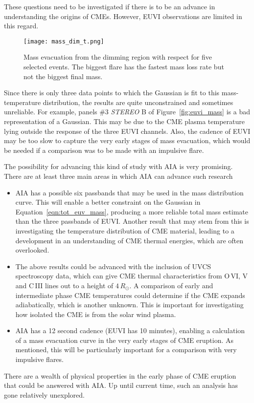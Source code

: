 These questions need to be investigated if there is to be an advance in understanding the origins of CMEs. However, EUVI observations are limited in this regard.
\begin{figure}[t!]
\begin{center}
\texttt{[image: mass\_dim\_t.png]}
\caption[Mass evacuation with time]{Mass evacuation from the dimming region with respect for five selected events. The biggest flare has the fastest mass loss rate but not the biggest final mass. \citep{aschw09}}
\label{fig:mass_dim_time}
\end{center}
\end{figure}
Since there is only three data points to which the Gaussian is fit to this mass-temperature distribution, the results are quite unconstrained and sometimes unreliable. For example, panels \#3 \emph{STEREO} B of Figure~\ref{fig:euvi_mass} is a bad representation of a Gaussian. This may be due to the CME plasma temperature lying outside the response of the three EUVI channels. Also, the cadence of EUVI may be too slow to capture the very early stages of mass evacuation, which would be needed if a comparison was to be made with an impulsive flare.

The possibility for advancing this kind of study with AIA is very promising. There are at least three main areas in which AIA can advance such research
\begin{itemize}
\item AIA has a possible six passbands that may be used in the mass distribution curve. This will enable a better constraint on the Gaussian in Equation~\ref{eqn:tot_euv_mass}, producing a more reliable total mass estimate than the three passbands of EUVI. Another result that may stem from this is investigating the temperature distribution of CME material, leading to a development in an understanding of CME thermal energies, which are often overlooked.
\item The above results could be advanced with the inclusion of UVCS spectroscopy data, which can give CME thermal characteristics from O\,VI, V and C\,III lines out to a height of $4\,R_{\odot}$. A comparison of early and intermediate phase CME temperatures could determine if the CME expands adiabatically, which is another unknown. This is important for investigating how isolated the CME is from the solar wind plasma.
\item AIA has a 12 second cadence (EUVI has 10 minutes), enabling a calculation of a mass evacuation curve in the very early stages of CME eruption. As mentioned, this will be particularly important for a comparison with very impulsive flares.
\end{itemize}
There are a wealth of physical properties in the early phase of CME eruption that could be answered with AIA. Up until current time, such an analysis has gone relatively unexplored.

